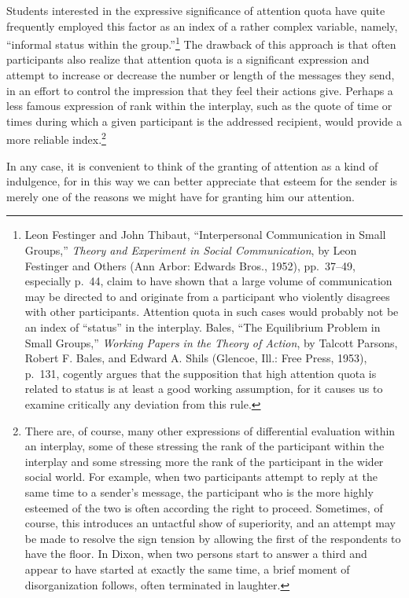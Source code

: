 \documentclass[openany,nobib]{tufte-book}
\begin{document}
Students interested in the expressive significance of attention quota
have quite frequently employed this factor as an index of a rather
complex variable, namely, ``informal status within the
group.''\footnote{Leon Festinger and John Thibaut, ``Interpersonal
  Communication in Small Groups,'' \emph{Theory and Experiment in Social
  Communication}, by Leon Festinger and Others (Ann Arbor: Edwards
  Bros., 1952), pp.~37--49, especially p.~44, claim to have shown that a
  large volume of communication may be directed to and originate from a
  participant who violently disagrees with other participants. Attention
  quota in such cases would probably not be an index of ``status'' in
  the interplay. Bales, ``The Equilibrium Problem in Small Groups,''
  \emph{Working Papers in the Theory of Action}, by Talcott Parsons,
  Robert F. Bales, and Edward A. Shils (Glencoe, Ill.: Free Press,
  1953), p.~131, cogently argues that the supposition that high
  attention quota is related to status is at least a good working
  assumption, for it causes us to examine critically any deviation from
  this rule.} The drawback of this approach is that often participants
also realize that attention quota is a significant expression and
attempt to increase or decrease the number or length of the messages
they send, in an effort to control the impression that they feel their
actions give. Perhaps a less famous expression of rank within the
interplay, such as the quote of time or times during which a given
participant is the addressed recipient, would provide a more reliable
index.\footnote{There are, of course, many other expressions of
  differential evaluation within an interplay, some of these stressing
  the rank of the participant within the interplay and some stressing
  more the rank of the participant in the wider social world. For
  example, when two participants attempt to reply at the same time to a
  sender's message, the participant who is the more highly esteemed of
  the two is often according the right to proceed. Sometimes, of course,
  this introduces an untactful show of superiority, and an attempt may
  be made to resolve the sign tension by allowing the first of the
  respondents to have the floor. In Dixon, when two persons start to
  answer a third and appear to have started at exactly the same time, a
  brief moment of disorganization follows, often terminated in laughter.}

In any case, it is convenient to think of the granting of attention as a
kind of indulgence, for in this way we can better appreciate that esteem
for the sender is merely one of the reasons we might have for granting
him our attention.
\end{document}
